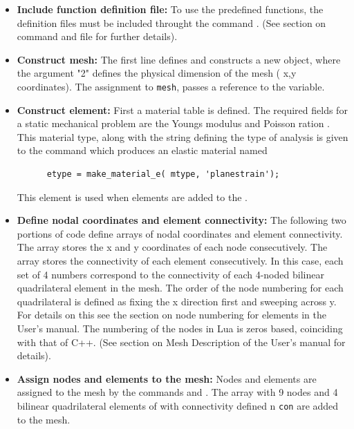 \clearpage
\begin{itemize}

  \item{\textbf{Include function definition file:}}
  To use the predefined functions, the definition files
  must be included throught the command .
  (See section on  command and file 
  for further details).

  \item{\textbf{Construct mesh:}}
  The first line defines and constructs 
  a new  object, where the
  argument "2" defines the physical dimension of
  the mesh ( x,y coordinates). The assignment to 
  {\tt mesh}, passes a reference to the variable.

  \item{\textbf{Construct element:}}
  First a material table  is defined. The
  required fields for a static mechanical problem are 
  the Youngs modulus  and Poisson ration .
  This material type, along with the string defining the 
  type of analysis is given to the command 
  which produces an elastic material named 
  \begin{verbatim}
      etype = make_material_e( mtype, 'planestrain');
  \end{verbatim}
  This element is used when elements are added to the .

  \item{\textbf{Define nodal coordinates and element connectivity:}}
  The following two portions of code define arrays of nodal 
  coordinates and element connectivity. The array 
  stores the x and y coordinates of each node consecutively.
  The array  stores the connectivity
  of each element consecutively. In this case, each set of 4 numbers 
  correspond to the connectivity of each 4-noded bilinear 
  quadrilateral element in the mesh. The order of the node 
  numbering for each quadrilateral is defined as fixing the x
  direction first and sweeping across y. For details on this
  see the section on node numbering for elements in the User's
  manual.
  The numbering of the nodes in Lua is zeros based, coinciding
  with that of C++.
  (See section on Mesh Description of the User's manual for details).

  \item{\textbf{Assign nodes and elements to the mesh:}}
  Nodes and elements are assigned to the mesh by the commands
   and . The
  array  with 9 nodes and 
  4 bilinear quadrilateral elements of  with
  connectivity defined n {\tt con} are added to the mesh.


\end{itemize}
